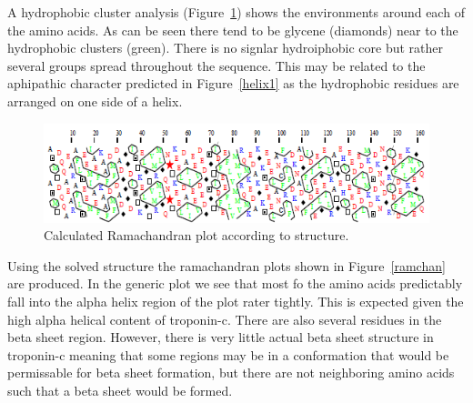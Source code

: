 \documentclass[12pt]{article}
\begin{document}
A hydrophobic cluster analysis (Figure~\ref{hca}) shows the environments around each of the amino acids. As can be seen there tend to be glycene (diamonds) near to the hydrophobic clusters (green). There is no signlar hydroiphobic core but rather several groups spread throughout the sequence. This may be related to the aphipathic character predicted in Figure~\ref{helix1} as the hydrophobic residues are arranged on one side of a helix.
\begin{figure}[H]
	\centering
	\includegraphics[width=\linewidth]{HCA.png}
	
	\caption{Calculated Ramachandran plot according to structure.}
	\label{hca}
\end{figure}

Using the solved structure the ramachandran plots shown in Figure~\ref{ramchan} are produced. In the generic plot we see that most fo the amino acids predictably fall into the alpha helix region of the plot rater tightly. This is expected given the high alpha helical content of troponin-c. There are also several residues in the beta sheet region. However, there is very little actual beta sheet structure in troponin-c meaning that some regions may be in a conformation that would be permissable for beta sheet formation, but there are not neighboring amino acids such that a beta sheet would be formed.
\end{document}

